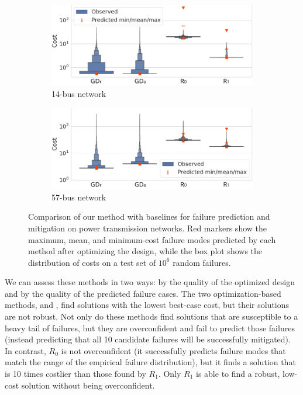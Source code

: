 \begin{figure}[tb]
    \centering
    \begin{subfigure}[t]{0.45\linewidth}
        \centering
        \includegraphics[width=\linewidth]{images/global_methods/14_bus_comparison.png}
        \caption{14-bus network}\label{ch:corl:fig:scopf_comparison:14_bus}
    \end{subfigure}
    \begin{subfigure}[t]{0.45\linewidth}
        \centering
        \includegraphics[width=\linewidth]{images/global_methods/57_bus_comparison.png}
        \caption{57-bus network}\label{ch:corl:fig:scopf_comparison:57_bus}
    \end{subfigure}
    \caption{Comparison of our method with baselines for failure prediction and mitigation on power transmission networks. Red markers show the maximum, mean, and minimum-cost failure modes predicted by each method after optimizing the design, while the box plot shows the distribution of costs on a test set of $10^6$ random failures.}
    \label{ch:corl:fig:scopf_comparison}
\end{figure}

We can assess these methods in two ways: by the quality of the optimized design and by the quality of the predicted failure cases. The two optimization-based methods, \gda{} and \gdr{}, find solutions with the lowest best-case cost, but their solutions are not robust. Not only do these methods find solutions that are susceptible to a heavy tail of failures, but they are overconfident and fail to predict those failures (instead predicting that all 10 candidate failures will be successfully mitigated). In contrast, $R_0$ is not overconfident (it successfully predicts failure modes that match the range of the empirical failure distribution), but it finds a solution that is 10 times costlier than those found by $R_1$. Only $R_1$ is able to find a robust, low-cost solution without being overconfident.


